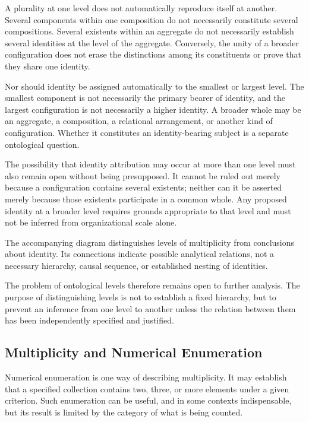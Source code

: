 A plurality at one level does not automatically reproduce
itself at another. Several components within one composition
do not necessarily constitute several compositions. Several
existents within an aggregate do not necessarily establish
several identities at the level of the aggregate. Conversely,
the unity of a broader configuration does not erase the
distinctions among its constituents or prove that they
share one identity.

Nor should identity be assigned automatically to the
smallest or largest level. The smallest component is not
necessarily the primary bearer of identity, and the
largest configuration is not necessarily a higher identity.
A broader whole may be an aggregate, a composition, a
relational arrangement, or another kind of configuration.
Whether it constitutes an identity-bearing subject is
a separate ontological question.

The possibility that identity attribution may occur at
more than one level must also remain open without being
presupposed. It cannot be ruled out merely because a
configuration contains several existents; neither can
it be asserted merely because those existents participate
in a common whole. Any proposed identity at a broader
level requires grounds appropriate to that level and
must not be inferred from organizational scale alone.

The accompanying diagram distinguishes levels of
multiplicity from conclusions about identity. Its
connections indicate possible analytical relations,
not a necessary hierarchy, causal sequence, or
established nesting of identities.



The problem of ontological levels therefore remains
open to further analysis. The purpose of distinguishing
levels is not to establish a fixed hierarchy, but to
prevent an inference from one level to another unless
the relation between them has been independently
specified and justified.

\subsection{Multiplicity and Numerical Enumeration}

Numerical enumeration is one way of describing
multiplicity. It may establish that a specified
collection contains two, three, or more elements
under a given criterion. Such enumeration can be
useful, and in some contexts indispensable, but
its result is limited by the category of what is
being counted.

